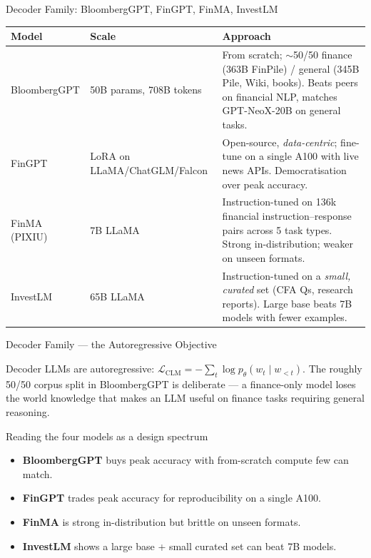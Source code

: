 \documentclass[9pt,t]{beamer}
\begin{document}
\begin{frame}{Decoder Family: BloombergGPT, FinGPT, FinMA, InvestLM}
\small
\begin{tabular}{p{}p{}p{}}
\toprule
\textbf{Model} & \textbf{Scale} & \textbf{Approach} \\
\midrule
BloombergGPT & 50B params, 708B tokens & From scratch; $\sim$50/50 finance (363B FinPile) / general (345B Pile, Wiki, books). Beats peers on financial NLP, matches GPT-NeoX-20B on general tasks. \\[3pt]
FinGPT & LoRA on LLaMA/ChatGLM/Falcon & Open-source, \emph{data-centric}; fine-tune on a single A100 with live news APIs. Democratisation over peak accuracy. \\[3pt]
FinMA (PIXIU) & 7B LLaMA & Instruction-tuned on 136k financial instruction--response pairs across 5 task types. Strong in-distribution; weaker on unseen formats. \\[3pt]
InvestLM & 65B LLaMA & Instruction-tuned on a \emph{small, curated} set (CFA Qs, research reports). Large base beats 7B models with fewer examples. \\
\bottomrule
\end{tabular}
\end{frame}

\begin{frame}{Decoder Family --- the Autoregressive Objective}
\begin{underhood}
Decoder LLMs are autoregressive: $\mathcal{L}_{\text{CLM}} = -\sum_t \log
p_\theta(w_t \mid w_{<t})$. The roughly 50/50 corpus split in BloombergGPT is
deliberate --- a finance-only model loses the world knowledge that makes an LLM
useful on finance tasks requiring general reasoning.
\end{underhood}

\medskip
\begin{block}{Reading the four models as a design spectrum}
\begin{itemize}
  \item \textbf{BloombergGPT} buys peak accuracy with from-scratch compute few can match.
  \item \textbf{FinGPT} trades peak accuracy for reproducibility on a single A100.
  \item \textbf{FinMA} is strong in-distribution but brittle on unseen formats.
  \item \textbf{InvestLM} shows a large base + small curated set can beat 7B models.
\end{itemize}
\end{block}
\end{frame}
\end{document}
